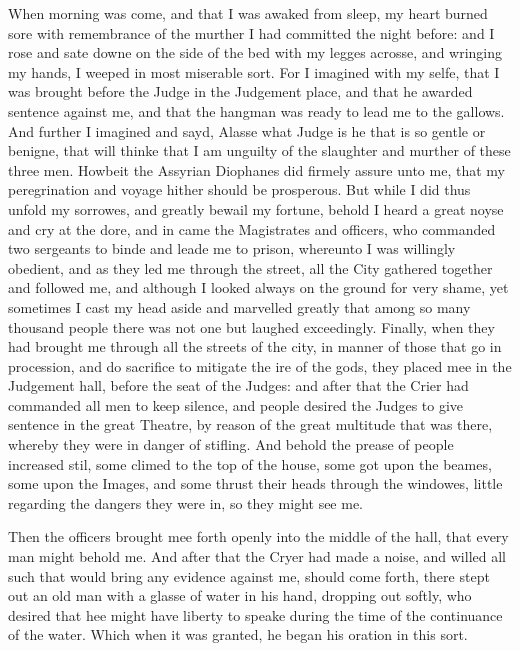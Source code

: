 When morning was come, and that I was awaked from sleep, my heart burned sore
with remembrance of the murther I had committed the night before: and I rose
and sate downe on the side of the bed with my legges acrosse, and wringing my
hands, I weeped in most miserable sort. For I imagined with my selfe, that I
was brought before the Judge in the Judgement place, and that he awarded
sentence against me, and that the hangman was ready to lead me to the gallows.
And further I imagined and sayd, Alasse what Judge is he that is so gentle or
benigne, that will thinke that I am unguilty of the slaughter and murther of
these three men. Howbeit the Assyrian Diophanes did firmely assure unto me,
that my peregrination and voyage hither should be prosperous. But while I did
thus unfold my sorrowes, and greatly bewail my fortune, behold I heard a great
noyse and cry at the dore, and in came the Magistrates and officers, who
commanded two sergeants to binde and leade me to prison, whereunto I was
willingly obedient, and as they led me through the street, all the City
gathered together and followed me, and although I looked always on the ground
for very shame, yet sometimes I cast my head aside and marvelled greatly that
among so many thousand people there was not one but laughed exceedingly.
Finally, when they had brought me through all the streets of the city, in
manner of those that go in procession, and do sacrifice to mitigate the ire of
the gods, they placed mee in the Judgement hall, before the seat of the Judges:
and after that the Crier had commanded all men to keep silence, and people
desired the Judges to give sentence in the great Theatre, by reason of the
great multitude that was there, whereby they were in danger of stifling. And
behold the prease of people increased stil, some climed to the top of the
house, some got upon the beames, some upon the Images, and some thrust their
heads through the windowes, little regarding the dangers they were in, so they
might see me.

Then the officers brought mee forth openly into the middle of the hall, that
every man might behold me. And after that the Cryer had made a noise, and
willed all such that would bring any evidence against me, should come forth,
there stept out an old man with a glasse of water in his hand, dropping out
softly, who desired that hee might have liberty to speake during the time of
the continuance of the water. Which when it was granted, he began his oration
in this sort.


